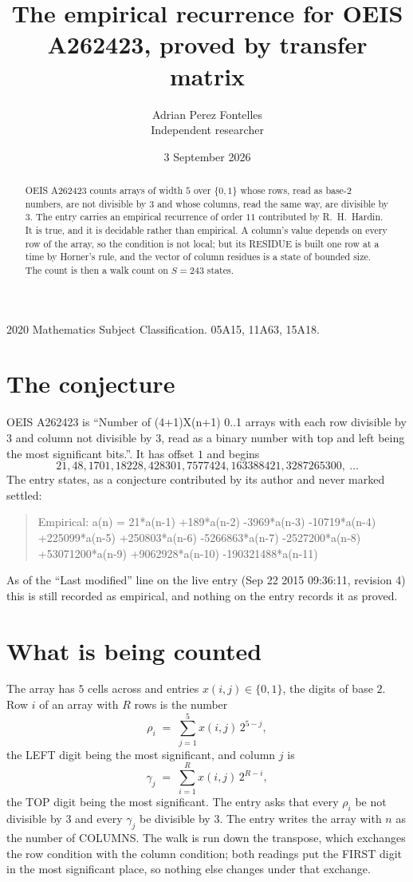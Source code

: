 \documentclass[11pt,a4paper]{article}
\title{The empirical recurrence for OEIS A262423, proved by transfer matrix}
\author{Adrian Perez Fontelles\\ \small Independent researcher}
\date{3 September 2026}
\theoremstyle{plain}
\theoremstyle{definition}
\begin{document}
\maketitle

\begin{abstract}
OEIS A262423 counts arrays of width $5$ over $\{0,1\}$ whose rows, read as base-$2$
numbers, are not divisible by $3$ and whose columns, read the same way, are divisible by
$3$. The entry carries an empirical recurrence of order $11$ contributed by
R.~H.~Hardin. It is true, and it is decidable rather than empirical. A column's value depends on
every row of the array, so the condition is not local; but its RESIDUE is built one row at a
time by Horner's rule, and the vector of column residues is a state of bounded size. The count
is then a walk count on $S=243$ states.
\end{abstract}

\noindent\small 2020 Mathematics Subject Classification. 05A15, 11A63, 15A18.\normalsize

\section{The conjecture}

OEIS A262423 is ``Number of (4+1)X(n+1) 0..1 arrays with each row divisible by 3 and column not divisible by 3, read as a binary number with top and left being the most significant bits.''. It has offset $1$ and begins
\[
21, 48, 1701, 18228, 428301, 7577424, 163388421, 3287265300,\ \dots
\]
The entry states, as a conjecture contributed by its author and never marked settled:
\begin{quote}
Empirical: a(n) = 21*a(n-1) +189*a(n-2) -3969*a(n-3) -10719*a(n-4) +225099*a(n-5) +250803*a(n-6) -5266863*a(n-7) -2527200*a(n-8) +53071200*a(n-9) +9062928*a(n-10) -190321488*a(n-11)
\end{quote}
As of the ``Last modified'' line on the live entry (Sep 22 2015 09:36:11, revision 4) this is still
recorded as empirical, and nothing on the entry records it as proved.

\section{What is being counted}

The array has $5$ cells across and entries $x(i,j)\in\{0,1\}$, the digits of
base $2$. Row $i$ of an array with $R$ rows is the number
\[
\rho_i\;=\;\sum_{j=1}^{5}x(i,j)\,2^{5-j} ,
\]
the LEFT digit being the most significant, and column $j$ is
\[
\gamma_j\;=\;\sum_{i=1}^{R}x(i,j)\,2^{R-i} ,
\]
the TOP digit being the most significant. The entry asks that every $\rho_i$ be not divisible by
$3$ and every $\gamma_j$ be divisible by $3$. The entry writes the array with $n$ as the number of COLUMNS. The walk is run down the transpose, which exchanges the row condition with the column condition; both readings put the FIRST digit in the most significant place, so nothing else changes under that exchange.
\end{document}
